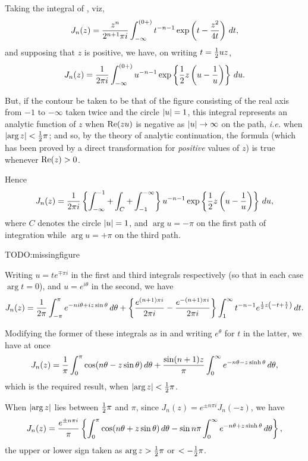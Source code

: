 \documentclass{book}
\begin{document}
Taking the integral of , viz,
$$
J_n(z) 
=
\frac{z^n}{2^{n+1}\pi i}
\int_{-\infty}^{(0+)}
t^{-n-1}
\exp\left(  t - \frac{z^2}{4t}   \right)
\, d t,
$$
%
%
and supposing that $z$ is positive, we have, on writing
$t = \frac{1}{2} u z$,
$$
J_n(z) 
= 
\frac{1}{2\pi i} 
\int_{-\infty}^{(0+)}
u^{-n-1}
\exp \left\{  \frac{1}{2} z \left(  u - \frac{1}{u}   \right)   \right\}
\, d u.
$$

But, if the contour be taken to be that of the figure consisting of
the real axis from $-1$ to $-\infty$ taken twice and the circle 
$\left| u \right| = 1$, this integral represents an analytic function of $z$
when $\mathrm{Re}(zu)$ is negative as
$\left| u \right| \rightarrow \infty$ on the path, \emph{i.e.} when 
$\left|  \arg z  \right| < \frac{1}{2} \pi$; and so, by the theory of analytic
continuation, the formula (which has been proved by a direct
transformation for \emph{positive} values of $z$) is true whenever 
$\mathrm{Re}(z) > 0$.

Hence
$$
J_n(z)
=
\frac{1}{2\pi i}
\left\{ 
  \int_{-\infty}^{-1}
  +
  \int_C
  +
  \int_{-1}^{-\infty}
 \right\}
u^{-n-1}
\exp\left\{  \frac{1}{2} z \left(  u - \frac{1}{u}   \right)   \right\}
\, d u,
$$
where $C$ denotes the circle $\left| u \right| = 1$, and 
$\arg u = -\pi$ on the first path of integration while 
$\arg u = +\pi$ on the third path.

TODO:missingfigure

Writing $u = t e^{\mp \pi i}$ in the first and third integrals
respectively (so that in each case $\arg t = 0$), and 
$u = e^{i\theta}$ in the second, we have
$$
J_n(z) 
=
\frac{1}{2\pi}
\int_{-\pi}^{\pi}
e^{-ni\theta + iz\sin\theta}
\, d \theta
+
\left\{ 
  \frac{e^{(n+1)\pi i}}{2\pi i}
  -
  \frac{e^{-(n+1)\pi i}}{2\pi i}
 \right\}
\int_1^{\infty}
t^{-n-1}
e^{\frac{1}{2} z \left( -t + \frac{1}{t} \right)}
\, d t.
$$

Modifying the former of these integrals as in
 and writing 
$e^{\theta}$ for $t$ in the latter, we have at once
$$
J_n(z)
=
\frac{1}{\pi}
\int_0^{\pi}
\cos(n\theta - z\sin\theta)
\, d\theta
+
\frac{\sin(n+1)z}{\pi}
\int_0^{\infty}
e^{-n\theta - z\sinh\theta}
\, d \theta,
$$
which is the required result, when
$\left| \arg z \right| < \frac{1}{2} \pi$.

When $\left|  \arg z  \right|$ lies between $\frac{1}{2} \pi$ and $\pi$, since 
$J_n(z) = e^{\pm n\pi i} J_n(-z)$, we have
\begin{equation}
  J_n(z)
  =
  \frac{e^{\pm n \pi i}}{\pi}
  \left\{ 
    \int_0^{\pi} \cos(n\theta + z\sin\theta) \, d\theta
    -
    \sin n\pi \int_0^{\infty} e^{-n\theta + z\sinh\theta} \, d\theta
     \right\},
\end{equation}
the upper or lower sign taken as
$\arg z > \frac{1}{2} \pi$ or $< -\frac{1}{2} \pi$.
\end{document}
